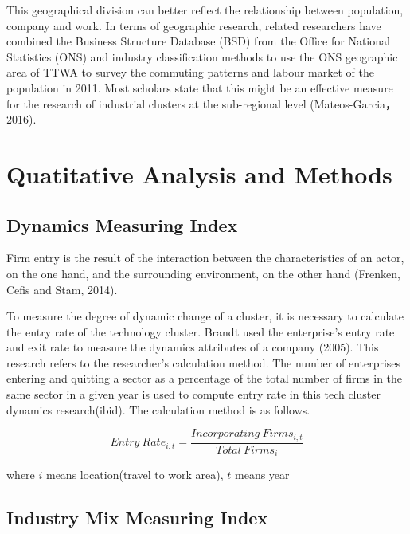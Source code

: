 \documentclass[
  12pt,
  oneside]{book}
\begin{document}
This geographical division can better reflect the relationship between population, company and work. In terms of geographic research, related researchers have combined the Business Structure Database (BSD) from the Office for National Statistics (ONS) and industry classification methods to use the ONS geographic area of TTWA to survey the commuting patterns and labour market of the population in 2011. Most scholars state that this might be an effective measure for the research of industrial clusters at the sub-regional level (Mateos-Garcia，2016).

\hypertarget{quatitative-analysis-and-methods}{%
\section{Quatitative Analysis and Methods}\label{quatitative-analysis-and-methods}}

\hypertarget{dynamics-measuring-index}{%
\subsection{Dynamics Measuring Index}\label{dynamics-measuring-index}}

Firm entry is the result of the interaction between the
characteristics of an actor, on the one hand, and the surrounding environment, on the other hand (Frenken, Cefis and Stam, 2014).

To measure the degree of dynamic change of a cluster, it is necessary to calculate the entry rate of the technology cluster. Brandt used the enterprise's entry rate and exit rate to measure the dynamics attributes of a company (2005). This research refers to the researcher's calculation method. The number of enterprises entering and quitting a sector as a percentage of the total number of firms in the same sector in a given year is used to compute entry rate in this tech cluster dynamics research(ibid). The calculation method is as follows.

\[ 
Entry\ Rate_{i,t} = \frac{Incorporating\ Firms_{i,t}}{Total\  Firms_{i}} 
\]

where \(i\) means location(travel to work area), \(t\) means year

\hypertarget{industry-mix-measuring-index}{%
\subsection{Industry Mix Measuring Index}\label{industry-mix-measuring-index}}
\end{document}
